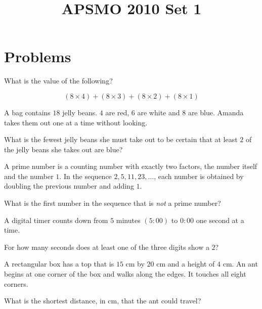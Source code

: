 \documentclass{article}
\title{APSMO 2010 Set 1}
\author{}
\date{}
\theoremstyle{mytheoremstyle}
\theoremstyle{mytheoremstyle}
\theoremstyle{myproblemstyle}
\begin{document}
    \maketitle

    \section{Problems}

    \begin{problem}
        What is the value of the following?

        \[(8 \times 4) + (8 \times 3) + (8 \times 2) + (8 \times 1)\]
    \end{problem}

    \begin{problem}
        A bag contains $18$ jelly beans. $4$ are red, $6$ are white and $8$ are blue. Amanda takes them out one at a time without looking. 

        What is the fewest jelly beans she must take out to be certain that at least $2$ of the jelly beans she takes out are blue?
    \end{problem}

    \begin{problem}
        A prime number is a counting number with exactly two factors, the number itself and the number $1$. In the sequence $2, 5, 11, 23, \dots$, each number is obtained by doubling the previous number and adding $1$.

        What is the first number in the sequence that is \textit{not} a prime number?
    \end{problem}

    \begin{problem}
        A digital timer counts down from $5$ minutes $(5:00)$ to $0:00$ one second at a time. 

        For how many seconds does at least one of the three digits show a $2$?
    \end{problem}

    \begin{problem}
        A rectangular box has a top that is $15$ cm by $20$ cm and a height of $4$ cm. An ant begins at one corner of the box and walks along the edges. It touches all eight corners. 

        What is the shortest distance, in cm, that the ant could travel?
    \end{problem}
    
\end{document}
